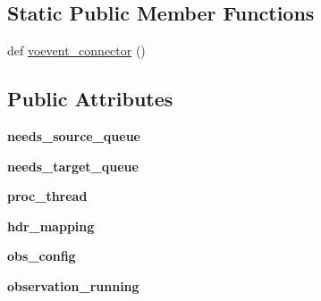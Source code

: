 \subsection*{Static Public Member Functions}
\begin{DoxyCompactItemize}
\item 
def \mbox{\hyperlink{classdarc_1_1amber__clustering_1_1_a_m_b_e_r_clustering_a4f4e06461abd527818868eb96e90d390}{voevent\+\_\+connector}} ()
\end{DoxyCompactItemize}
\subsection*{Public Attributes}
\begin{DoxyCompactItemize}
\item 
\mbox{\label{classdarc_1_1amber__clustering_1_1_a_m_b_e_r_clustering_addfd37b866c0e67b2488ab40da6bdcb1}} 
{\bfseries needs\+\_\+source\+\_\+queue}
\item 
\mbox{\label{classdarc_1_1amber__clustering_1_1_a_m_b_e_r_clustering_a319abb4b8b8f2838ace33292d503040c}} 
{\bfseries needs\+\_\+target\+\_\+queue}
\item 
\mbox{\label{classdarc_1_1amber__clustering_1_1_a_m_b_e_r_clustering_a79db0a75e1a3a7cb036ffbfcdda5c22a}} 
{\bfseries proc\+\_\+thread}
\item 
\mbox{\label{classdarc_1_1amber__clustering_1_1_a_m_b_e_r_clustering_a5135ac747bf30e691d84762bba4d9aab}} 
{\bfseries hdr\+\_\+mapping}
\item 
\mbox{\label{classdarc_1_1amber__clustering_1_1_a_m_b_e_r_clustering_a7ab90294c8e148505ef87b404a2d4716}} 
{\bfseries obs\+\_\+config}
\item 
\mbox{\label{classdarc_1_1amber__clustering_1_1_a_m_b_e_r_clustering_aa3eedb001256fd903c3ca287716b7e3d}} 
{\bfseries observation\+\_\+running}
\item 
\mbox{\label{classdarc_1_1amber__clustering_1_1_a_m_b_e_r_clustering_a6e4ce03cbdc78da7afc3b1754a698e20}} 

\end{DoxyCompactItemize}
